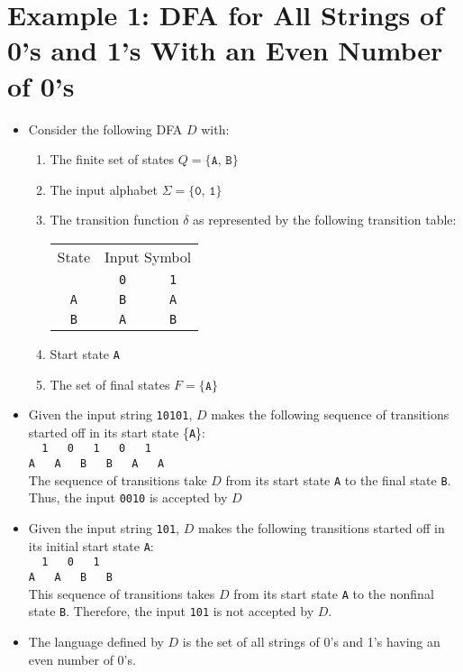 \documentclass[]{article}
\begin{document}
\section{Example 1: DFA for All Strings of 0's and 1's With an Even Number of
0's}
  \begin{itemize}
    \item Consider the following DFA $D$ with:
      \begin{enumerate}
        \item The finite set of states $Q = \{ \texttt{A, B} \}$
        \item The input alphabet $\Sigma = \{ \texttt{0, 1} \}$
        \item The transition function $\delta$ as represented by the following
        transition table:

          \begin{tabular}{|c|c|c|}
            \hline
            State & \multicolumn{2}{|c|}{Input Symbol} \\ \cline{2-3}
                  & \texttt{0} & \texttt{1} \\ \hline
            \texttt{A} & \texttt{B} & \texttt{A} \\ \hline
            \texttt{B} & \texttt{A} & \texttt{B} \\ \hline
          \end{tabular}

        \item Start state \texttt{A}
        \item The set of final states $F = \{ \texttt{A} \}$
      \end{enumerate}
    \item Given the input string \texttt{10101}, $D$ makes the following
    sequence of transitions started off in its start state \{\texttt{A}\}:\\
    \verb|  1   0   1   0   1  |\\
    \verb|A   A   B   B   A   A| \\
    The sequence of transitions take $D$ from its start state \texttt{A} to
    the final state \texttt{B}. Thus, the input \texttt{0010} is accepted by
    $D$
    \item Given the input string \texttt{101}, $D$ makes the following
    transitions started off in its initial start state \texttt{A}:\\
    \verb|  1   0   1  | \\
    \verb|A   A   B   B| \\
    This sequence of transitions takes $D$ from its start state \texttt{A} to
    the nonfinal state \texttt{B}. Therefore, the input \texttt{101} is not
    accepted by $D$.
    \item The language defined by $D$ is the set of all strings of 0's and 1's
    having an even number of 0's.
  \end{itemize}
\end{document}
